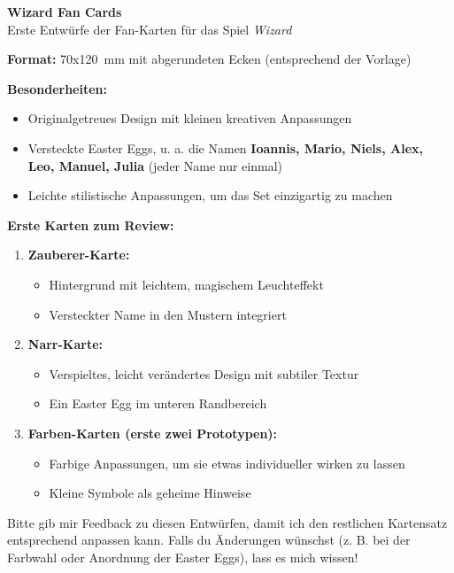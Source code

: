 \documentclass{article}
\begin{document}
\thispagestyle{empty}
\begin{center}
    \Large \textbf{Wizard Fan Cards}\\[1em]
    \normalsize Erste Entwürfe der Fan-Karten für das Spiel \textit{Wizard}
\end{center}

\vspace{0.5em}

\textbf{Format:} 70x120~mm mit abgerundeten Ecken (entsprechend der Vorlage)

\vspace{0.5em}

\textbf{Besonderheiten:}
\begin{itemize}
    \item Originalgetreues Design mit kleinen kreativen Anpassungen
    \item Versteckte Easter Eggs, u. a. die Namen \textbf{Ioannis, Mario, Niels, Alex, Leo, Manuel, Julia} (jeder Name nur einmal)
    \item Leichte stilistische Anpassungen, um das Set einzigartig zu machen
\end{itemize}

\vspace{0.5em}

\textbf{Erste Karten zum Review:}
\begin{enumerate}
    \item \textbf{Zauberer-Karte:}
    \begin{itemize}
        \item Hintergrund mit leichtem, magischem Leuchteffekt
        \item Versteckter Name in den Mustern integriert
    \end{itemize}
    \item \textbf{Narr-Karte:}
    \begin{itemize}
        \item Verspieltes, leicht verändertes Design mit subtiler Textur
        \item Ein Easter Egg im unteren Randbereich
    \end{itemize}
    \item \textbf{Farben-Karten (erste zwei Prototypen):}
    \begin{itemize}
        \item Farbige Anpassungen, um sie etwas individueller wirken zu lassen
        \item Kleine Symbole als geheime Hinweise
    \end{itemize}
\end{enumerate}

\vspace{0.5em}

Bitte gib mir Feedback zu diesen Entwürfen, damit ich den restlichen Kartensatz entsprechend anpassen kann. Falls du Änderungen wünschst (z. B. bei der Farbwahl oder Anordnung der Easter Eggs), lass es mich wissen!
\end{document}

